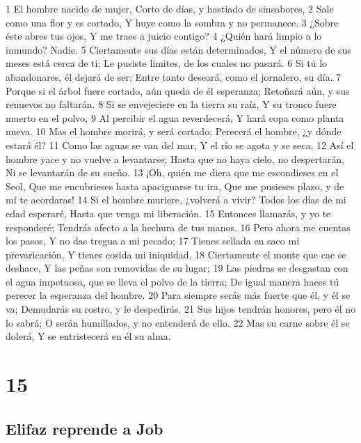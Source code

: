 1 El hombre nacido de mujer,  
Corto de días, y hastiado de sinsabores,  
2 Sale como una flor y es cortado,  
Y huye como la sombra y no permanece.  
3 ¿Sobre éste abres tus ojos,  
Y me traes a juicio contigo?  
4 ¿Quién hará limpio a lo inmundo?  
Nadie.  
5 Ciertamente sus días están determinados,  
Y el número de sus meses está cerca de ti;  
Le pusiste límites, de los cuales no pasará.  
6 Si tú lo abandonares, él dejará de ser;  
Entre tanto deseará, como el jornalero, su día.  
7 Porque si el árbol fuere cortado, aún queda de él esperanza;  
Retoñará aún, y sus renuevos no faltarán.  
8 Si se envejeciere en la tierra su raíz,  
Y su tronco fuere muerto en el polvo,  
9 Al percibir el agua reverdecerá,  
Y hará copa como planta nueva.  
10 Mas el hombre morirá, y será cortado;  
Perecerá el hombre, ¿y dónde estará él?  
11 Como las aguas se van del mar,  
Y el río se agota y se seca,  
12 Así el hombre yace y no vuelve a levantarse;  
Hasta que no haya cielo, no despertarán,  
Ni se levantarán de su sueño.  
13 ¡Oh, quién me diera que me escondieses en el Seol,  
Que me encubrieses hasta apaciguarse tu ira,  
Que me pusieses plazo, y de mí te acordaras!  
14 Si el hombre muriere, ¿volverá a vivir?  
Todos los días de mi edad esperaré,  
Hasta que venga mi liberación.  
15 Entonces llamarás, y yo te responderé;  
Tendrás afecto a la hechura de tus manos.  
16 Pero ahora me cuentas los pasos,  
Y no das tregua a mi pecado;  
17 Tienes sellada en saco mi prevaricación,  
Y tienes cosida mi iniquidad.  
18 Ciertamente el monte que cae se deshace,  
Y las peñas son removidas de su lugar;  
19 Las piedras se desgastan con el agua impetuosa, que se lleva el polvo de la tierra;  
De igual manera haces tú perecer la esperanza del hombre.  
20 Para siempre serás más fuerte que él, y él se va;  
Demudarás su rostro, y le despedirás. 
21 Sus hijos tendrán honores, pero él no lo sabrá;  
O serán humillados, y no entenderá de ello.  
22 Mas su carne sobre él se dolerá,  
Y se entristecerá en él su alma. 

\chapter{15}

\section*{Elifaz reprende a Job}  

